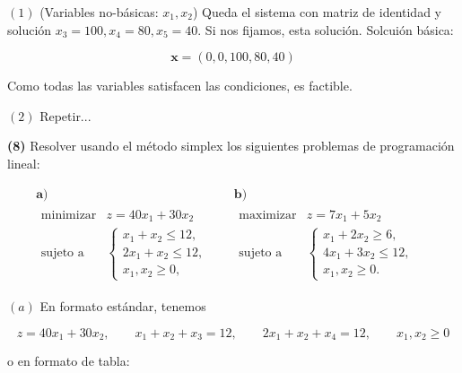 \documentclass[12pt]{article}
\begin{document}
$(1)$ (Variables no-básicas: $x_1, x_2$) Queda el sistema con matriz de
identidad y solución $x_3 = 100, x_4 = 80, x_5 = 40$. Si nos fijamos,
esta solución. Solcuión básica: 

\begin{equation*}
    \textbf{x} = (0, 0, 100, 80, 40)
\end{equation*}

Como todas las variables satisfacen las condiciones, es factible.

$(2)$ Repetir...

\pagebreak 

\pagebreak
\begin{myframe}
    \textbf{(8)} Resolver usando el método simplex los siguientes problemas de programación lineal:

\[
\begin{array}{cc}
\textbf{a)} &
\textbf{b)}
\\[1em]
\begin{array}{rcl}
\text{minimizar} & z = 40x_1 + 30x_2 & \\
\text{sujeto a} &
\begin{cases}
x_1+x_2\le 12,\\
2x_1+x_2\le 12,\\
x_1,x_2\ge 0,
\end{cases}
\end{array}
&
\begin{array}{rcl}
\text{maximizar} & z = 7x_1 + 5x_2 & \\
\text{sujeto a} &
\begin{cases}
x_1+2x_2\ge 6,\\
4x_1+3x_2\le 12,\\
x_1,x_2\ge 0.
\end{cases}
\end{array}
\end{array}
\]
\end{myframe}

$(a)$ En formato estándar, tenemos 

\begin{equation*}
    z = 40x_1 + 30x_2, \qquad x_1 + x_2 + x_3 = 12, \qquad 2x_1 + x_2 + x_4 =
    12, \qquad x_1,x_2 \geq 0
\end{equation*}

o en formato de tabla:
\end{document}
